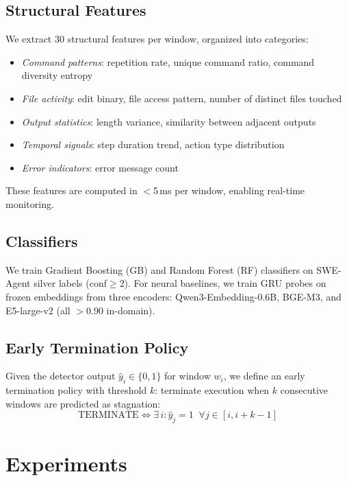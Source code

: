 \documentclass[11pt,a4paper]{article}
\begin{document}
\subsection{Structural Features}

We extract 30 structural features per window, organized into categories:

\begin{itemize}
\item \emph{Command patterns}: repetition rate, unique command ratio, command diversity entropy
\item \emph{File activity}: edit binary, file access pattern, number of distinct files touched
\item \emph{Output statistics}: length variance, similarity between adjacent outputs
\item \emph{Temporal signals}: step duration trend, action type distribution
\item \emph{Error indicators}: error message count
\end{itemize}

These features are computed in $<$5\,ms per window, enabling real-time monitoring.

\subsection{Classifiers}

We train Gradient Boosting (GB) and Random Forest (RF) classifiers on SWE-Agent silver labels (conf$\geq$2).
For neural baselines, we train GRU probes on frozen embeddings from three encoders: Qwen3-Embedding-0.6B, BGE-M3, and E5-large-v2 (all $>$0.90 in-domain).

\subsection{Early Termination Policy}

Given the detector output $\hat{y}_i \in \{0,1\}$ for window $w_i$, we define an early termination policy with threshold $k$: terminate execution when $k$ consecutive windows are predicted as stagnation:
\begin{equation}
\text{TERMINATE} \iff \exists\, i : \hat{y}_j = 1 \;\; \forall j \in [i, i+k-1]
\end{equation}

\section{Experiments}
\label{sec:experiments}
\end{document}
